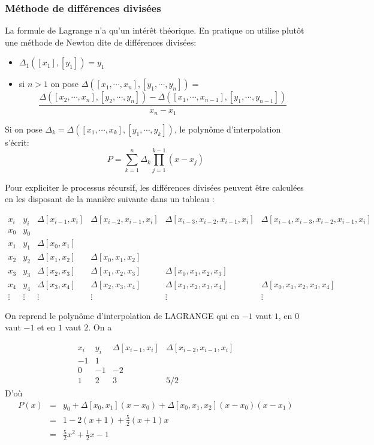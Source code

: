 \documentclass{beamer}
\begin{document}
\begin{frame}
 \frametitle{Méthode de différences divisées}
 La formule de Lagrange n'a qu'un intérêt théorique. En pratique  on utilise plutôt une méthode de Newton dite de différences divisées:
 
 
\begin{itemize}
  \item $\Delta_1([x_1],[y_1])=y_1$
  \item si $n>1$ on pose $\Delta([x_1,\cdots,x_n],[y_1,\cdots,y_n])=$
 {\small  \[\frac{\Delta([x_2,\cdots,x_n],[y_2,\cdots,y_n])-\Delta([x_1,\cdots,x_{n-1}],[y_1,\cdots,y_{n-1}])}{x_n-x_1}\]}
 \end{itemize}
 

Si on pose $\Delta_k=\Delta([x_1,\cdots,x_k],[y_1,\cdots,y_k])$, le polynôme d'interpolation s'écrit:
\[ P=\sum_{k=1}^n\Delta_k\prod_{j=1}^{k-1}(x-x_j)\]
\end{frame}

\begin{frame}
Pour expliciter le processus récursif, les différences divisées peuvent être calculées en les disposant de la manière suivante dans un tableau :
\begin{footnotesize}
\[\begin{array}{cc|cccc}\hline
x_i&y_i&\Delta[x_{i-1},x_i]&\Delta[x_{i-2},x_{i-1},x_i]&\Delta[x_{i-3},x_{i-2},x_{i-1},x_i]&\Delta[x_{i-4},x_{i-3},x_{i-2},x_{i-1},x_i]\\ \hline\hline
x_0&\boxed{y_0}&&&& \\
x_1&y_1&\boxed{\Delta[x_0,x_1]}&&& \\
x_2&y_2&\Delta[x_1,x_2]&\boxed{\Delta[x_0,x_1,x_2]}&& \\
x_3&y_3&\Delta[x_2,x_3]&\Delta[x_1,x_2,x_3]&\boxed{\Delta[x_0,x_1,x_2,x_3]}& \\
x_4&y_4&\Delta[x_3,x_4]&\Delta[x_2,x_3,x_4]&\Delta[x_1,x_2,x_3,x_4]&\boxed{\Delta[x_0,x_1,x_2,x_3,x_4]} \\
\vdots &\vdots &\vdots &\vdots &\vdots &\vdots 
\end{array}
\]
\end{footnotesize}
\end{frame}



\begin{frame}
On reprend le polynôme d'interpolation de LAGRANGE qui en $-1$ vaut $1$, en $0$ vaut $-1$ et en $1$ vaut $2$. On a

\[\begin{array}{cc|cc}\hline
x_i&y_i&\Delta[x_{i-1},x_i]&\Delta[x_{i-2},x_{i-1},x_i] \\ \hline\hline
-1&\boxed{1}&& \\
0&-1&\boxed{-2}& \\
1&2&3&\boxed{5/2}
\end{array}
\]
D'où
\[\begin{array}{ccl}
P(x)&=&y_0+\Delta[x_0,x_1](x-x_0)+\Delta[x_0,x_1,x_2](x-x_0)(x-x_1)\\
&=&1-2(x+1)+\frac{5}{2}(x+1)x\\
&=&\frac 52x^2+\frac 12x-1
\end{array}
\]
\end{frame}
\end{document}
